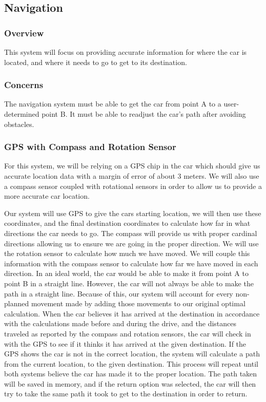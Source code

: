 \documentclass[onecolumn, draftclsnofoot, 10pt, compsoc]{IEEEtran}
\begin{document}
 
\subsection{Navigation}

\subsubsection{Overview}
 This system will focus on providing accurate information for where the car is located, and where it needs to go to get to its destination.

\subsubsection{Concerns}
The navigation system must be able to get the car from point A to a user-determined point B. It must be able to readjust the car’s path after avoiding obstacles.

\subsubsection{GPS with Compass and Rotation Sensor}
For this system, we will be relying on a GPS chip in the car which should give us accurate location data with a margin of error of about 3 meters. We will also use a compass sensor coupled with rotational sensors in order to allow us to provide a more accurate car location. 

Our system will use GPS to give the cars starting location, we will then use these coordinates, and the final destination coordinates to calculate how far in what directions the car needs to go. The compass will provide us with proper cardinal directions allowing us to ensure we are going in the proper direction. We will use the rotation sensor to calculate how much we have moved. We will couple this information with the compass sensor to calculate how far we have moved in each direction. In an ideal world, the car would be able to make it from point A to point B in a straight line. However, the car will not always be able to make the path in a straight line. Because of this, our system will account for every non-planned movement made by adding those movements to our original optimal calculation. When the car believes it has arrived at the destination in accordance with the calculations made before and during the drive, and the distances traveled as reported by the compass and rotation sensors, the car will check in with the GPS to see if it thinks it has arrived at the given destination. If the GPS shows the car is not in the correct location, the system will calculate a path from the current location, to the given destination. This process will repeat until both systems believe the car has made it to the proper location. The path taken will be saved in memory, and if the return option was selected, the car will then try to take the same path it took to get to the destination in order to return.
\end{document}

